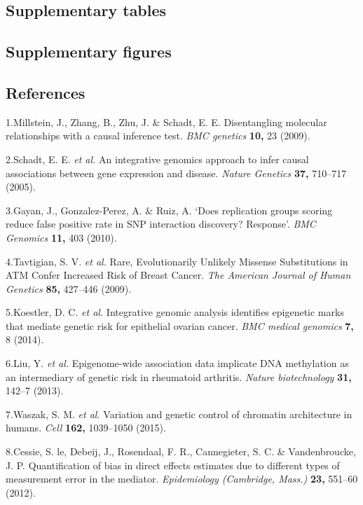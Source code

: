 \documentclass[]{article}
\begin{document}
\newpage

\subsection{Supplementary tables}\label{supplementary-tables}

\newpage

\subsection{Supplementary figures}\label{supplementary-figures}

\subsection*{References}\label{references}

1.Millstein, J., Zhang, B., Zhu, J. \& Schadt, E. E. Disentangling
molecular relationships with a causal inference test. \emph{BMC
genetics} \textbf{10,} 23 (2009).

2.Schadt, E. E. \emph{et al.} An integrative genomics approach to infer
causal associations between gene expression and disease. \emph{Nature
Genetics} \textbf{37,} 710--717 (2005).

3.Gayan, J., Gonzalez-Perez, A. \& Ruiz, A. `Does replication groups
scoring reduce false positive rate in SNP interaction discovery?
Response'. \emph{BMC Genomics} \textbf{11,} 403 (2010).

4.Tavtigian, S. V. \emph{et al.} Rare, Evolutionarily Unlikely Missense
Substitutions in ATM Confer Increased Risk of Breast Cancer. \emph{The
American Journal of Human Genetics} \textbf{85,} 427--446 (2009).

5.Koestler, D. C. \emph{et al.} Integrative genomic analysis identifies
epigenetic marks that mediate genetic risk for epithelial ovarian
cancer. \emph{BMC medical genomics} \textbf{7,} 8 (2014).

6.Liu, Y. \emph{et al.} Epigenome-wide association data implicate DNA
methylation as an intermediary of genetic risk in rheumatoid arthritis.
\emph{Nature biotechnology} \textbf{31,} 142--7 (2013).

7.Waszak, S. M. \emph{et al.} Variation and genetic control of chromatin
architecture in humans. \emph{Cell} \textbf{162,} 1039--1050 (2015).

8.Cessie, S. le, Debeij, J., Rosendaal, F. R., Cannegieter, S. C. \&
Vandenbroucke, J. P. Quantification of bias in direct effects estimates
due to different types of measurement error in the mediator.
\emph{Epidemiology (Cambridge, Mass.)} \textbf{23,} 551--60 (2012).
\end{document}
